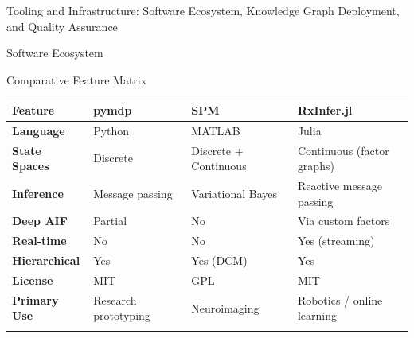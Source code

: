 \documentclass[
  ignorenonframetext,
]{beamer}
\newcounter{none} %
\begin{document}
\begin{frame}[fragile]{Tooling and Infrastructure: Software Ecosystem,
Knowledge Graph Deployment, and Quality Assurance \label{sec:tooling}}
\begin{block}{Software Ecosystem}
\begin{block}{Comparative Feature Matrix}
\protect{}\label{comparative-feature-matrix}
{\def\LTcaptype{none} %
\begin{longtable}[]{@{}
  >{\raggedright\arraybackslash}p{}
  >{\raggedright\arraybackslash}p{}
  >{\raggedright\arraybackslash}p{}
  >{\raggedright\arraybackslash}p{}@{}}
\toprule\noalign{}
\begin{minipage}[b]{\linewidth}\raggedright
Feature
\end{minipage} & \begin{minipage}[b]{\linewidth}\raggedright
pymdp
\end{minipage} & \begin{minipage}[b]{\linewidth}\raggedright
SPM
\end{minipage} & \begin{minipage}[b]{\linewidth}\raggedright
RxInfer.jl
\end{minipage} \\
\midrule\noalign{}
\endhead
\textbf{Language} & Python & MATLAB & Julia \\
\textbf{State Spaces} & Discrete & Discrete + Continuous & Continuous
(factor graphs) \\
\textbf{Inference} & Message passing & Variational Bayes & Reactive
message passing \\
\textbf{Deep AIF} & Partial & No & Via custom factors \\
\textbf{Real-time} & No & No & Yes (streaming) \\
\textbf{Hierarchical} & Yes & Yes (DCM) & Yes \\
\textbf{License} & MIT & GPL & MIT \\
\textbf{Primary Use} & Research prototyping & Neuroimaging & Robotics /
online learning \\
\bottomrule\noalign{}
\end{longtable}
}


\end{block}
\end{block}
\end{frame}
\end{document}

